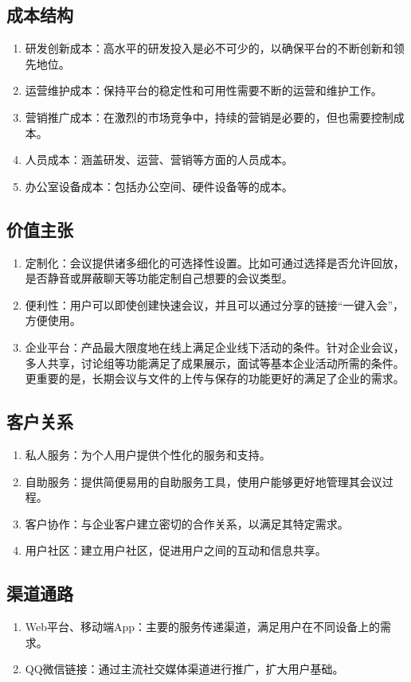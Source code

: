 \documentclass[a4paper,12pt]{article}
\begin{document}
\subsection{成本结构}
\begin{enumerate}
    \item 研发创新成本：高水平的研发投入是必不可少的，以确保平台的不断创新和领先地位。
    \item 运营维护成本：保持平台的稳定性和可用性需要不断的运营和维护工作。
    \item 营销推广成本：在激烈的市场竞争中，持续的营销是必要的，但也需要控制成本。
    \item 人员成本：涵盖研发、运营、营销等方面的人员成本。
    \item 办公室设备成本：包括办公空间、硬件设备等的成本。
\end{enumerate}

\subsection{价值主张}
\begin{enumerate}
	\item 定制化：会议提供诸多细化的可选择性设置。比如可通过选择是否允许回放，是否静音或屏蔽聊天等功能定制自己想要的会议类型。
	\item 便利性：用户可以即使创建快速会议，并且可以通过分享的链接“一键入会”，方便使用。
	\item 企业平台：产品最大限度地在线上满足企业线下活动的条件。针对企业会议，多人共享，讨论组等功能满足了成果展示，面试等基本企业活动所需的条件。更重要的是，长期会议与文件的上传与保存的功能更好的满足了企业的需求。
\end{enumerate}

\subsection{客户关系}
\begin{enumerate}
    \item 私人服务：为个人用户提供个性化的服务和支持。
    \item 自助服务：提供简便易用的自助服务工具，使用户能够更好地管理其会议过程。
    \item 客户协作：与企业客户建立密切的合作关系，以满足其特定需求。
    \item 用户社区：建立用户社区，促进用户之间的互动和信息共享。
\end{enumerate}

\subsection{渠道通路}
\begin{enumerate}
    \item Web平台、移动端App：主要的服务传递渠道，满足用户在不同设备上的需求。
    \item QQ微信链接：通过主流社交媒体渠道进行推广，扩大用户基础。
\end{enumerate}
\end{document}

